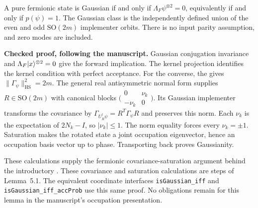 \begin{lemma}\label{lem:exact-fermions}
  \leanok
  \par
  A pure fermionic state is Gaussian if and only if
  $\Lambda_F\psi^{\otimes2}=0$, equivalently if and only if $p(\psi)=1$.
  The Gaussian class is the independently defined union of the even and odd
  $\mathrm{SO}(2m)$ implementer orbits. There is no input parity assumption,
  and zero modes are included.

  \textbf{Checked proof, following the manuscript.} Gaussian conjugation
  invariance and $\Lambda_F\lvert x \rangle^{\otimes2}=0$ give the forward implication.
  The kernel projection identifies the kernel condition with perfect acceptance.
  For the converse, the 
  gives $\|\Gamma_\psi\|_{\mathrm{HS}}^2=2m$. The general real antisymmetric
  normal form supplies $R\in\mathrm{SO}(2m)$ with canonical blocks
  $\bigl(\begin{smallmatrix}0&\nu_k\\-\nu_k&0\end{smallmatrix}\bigr)$.
  Its Gaussian implementer transforms the covariance by
  $\Gamma_{U_R^\dagger\psi}=R^T\Gamma_\psi R$ and preserves this norm.
  Each $\nu_k$ is the expectation of $2N_k-I$, so $|\nu_k|\le1$.
  The norm equality forces every $\nu_k=\pm1$. Saturation makes the rotated
  state a joint occupation eigenvector, hence an occupation basis vector up
  to phase. Transporting back proves Gaussianity.

  These calculations supply the fermionic covariance-saturation argument
  behind the introductory . These covariance
  and saturation calculations are steps of Lemma~5.1.
  The equivalent coordinate interfaces \texttt{isGaussian\_iff} and
  \texttt{isGaussian\_iff\_accProb} use this same proof. No obligations remain for this
  lemma in the manuscript's occupation presentation.
\end{lemma}

